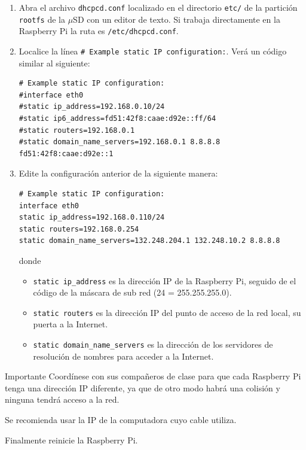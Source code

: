 \documentclass[letterpaper,10.5pt]{article}
\begin{document}
\begin{enumerate}
	\item Abra el archivo \texttt{dhcpcd.conf} localizado en el directorio \texttt{etc/} de la partición \texttt{rootfs} de la $\mu$SD con un editor de texto.
	Si trabaja directamente en la Raspberry Pi la ruta es \texttt{/etc/dhcpcd.conf}.

	\item Localice la línea \texttt{\# Example static IP configuration:}. Verá un código similar al siguiente:

\begin{Verbatim}[fontsize=\footnotesize]
# Example static IP configuration:
#interface eth0
#static ip_address=192.168.0.10/24
#static ip6_address=fd51:42f8:caae:d92e::ff/64
#static routers=192.168.0.1
#static domain_name_servers=192.168.0.1 8.8.8.8 fd51:42f8:caae:d92e::1
\end{Verbatim}

	\item Edite la configuración anterior de la siguiente manera:
\begin{Verbatim}[fontsize=\footnotesize]
# Example static IP configuration:
interface eth0
static ip_address=192.168.0.110/24
static routers=192.168.0.254
static domain_name_servers=132.248.204.1 132.248.10.2 8.8.8.8
\end{Verbatim}
	donde
	\begin{itemize}
		\item \texttt{static ip\_address} es la dirección IP de la Raspberry Pi, seguido de el código de la máscara de sub red (24 = 255.255.255.0).
		\item \texttt{static routers} es la dirección IP del punto de acceso de la red local, su puerta a la Internet.
		\item \texttt{static domain\_name\_servers} es la dirección de los servidores de resolución de nombres para acceder a la Internet.
	\end{itemize}
\end{enumerate}

\begin{greenbox}{Importante}
Coordínese con sus compañeros de clase para que cada Raspberry Pi tenga una dirección IP diferente, ya que de otro modo habrá una colisión y ninguna tendrá acceso a la red.

Se recomienda usar la IP de la computadora cuyo cable utiliza.
\end{greenbox}

\noindent
Finalmente reinicie la Raspberry Pi.
\end{document}
